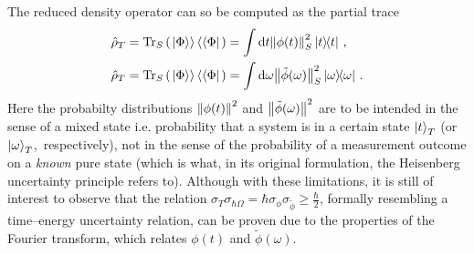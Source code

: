 The reduced density operator can so be computed
as the partial trace
\begin{align}
  \label{eq:ptrace_density_matrix_t}
  \hat{\rho}_T = \Tr_S\qty(\left.\left| \Phi \right\rangle\right\rangle\left\langle\left\langle \Phi \right|\right.) &= \int \dd t \norm{\phi(t)}^2_S \ketbra{t}{t}
    \, \text{,}
  \\
  \label{eq:ptrace_density_matrix_omega}
  \hat{\rho}_T = \Tr_S\qty(\left.\left| \Phi \right\rangle\right\rangle\left\langle\left\langle \Phi \right|\right.) &= \int \dd \omega \norm{\tilde{\phi}(\omega)}^2_S \ketbra{\omega}{\omega}
    \,\text{.}
\end{align}
Here the probabilty distributions $\norm{\phi(t)}^2$ and $\norm{\tilde{\phi}(\omega)}^2$
are to be intended in the sense of a mixed state
i.e. probability that a system is in a certain state $\ket{t}_T$
(or $\ket{\omega}_T$,~respectively),
not in the sense of the probability of a measurement outcome on a \emph{known} pure state
(which is what, in its original formulation, the Heisenberg uncertainty principle
refers to).
Although with these limitations, it is still of interest to observe that
the relation $\sigma_T\sigma_{\hbar\Omega} = \hbar \sigma_{\phi} \sigma_{\tilde{\phi}} \geq \frac{\hbar}{2}$,
formally resembling a time--energy uncertainty relation,
can be proven
due to the properties of the Fourier transform,
which relates $\phi(t)$ and $\tilde{\phi}(\omega)$.
